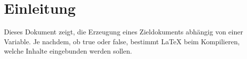 \section{Einleitung}
Dieses Dokument zeigt, die Erzeugung eines Zieldokuments abhängig von einer Variable.
Je nachdem, ob true oder false, bestimmt LaTeX beim Kompilieren, welche Inhalte eingebunden
werden sollen.